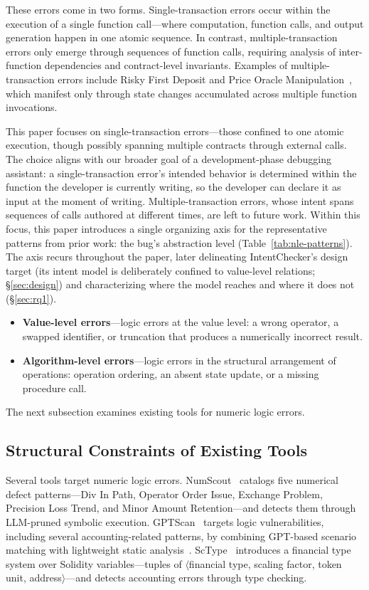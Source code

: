 \documentclass[pdflatex,sn-basic]{sn-jnl}%
\theoremstyle{thmstyleone}%
\theoremstyle{thmstyletwo}%
\theoremstyle{thmstylethree}%
\begin{document}
These errors come in two forms.
Single-transaction errors occur within the execution of a single function call---where computation, function calls, and output generation happen in one atomic sequence.
In contrast, multiple-transaction errors only emerge through sequences of function calls, requiring analysis of inter-function dependencies and contract-level invariants.
Examples of multiple-transaction errors include Risky First Deposit and Price Oracle Manipulation~\citep{gptscan, exploitablebugs}, which manifest only through state changes accumulated across multiple function invocations.

This paper focuses on single-transaction errors---those confined to one atomic execution, though possibly spanning multiple contracts through external calls. The choice aligns with our broader goal of a development-phase debugging assistant: a single-transaction error's intended behavior is determined within the function the developer is currently writing, so the developer can declare it as input at the moment of writing. Multiple-transaction errors, whose intent spans sequences of calls authored at different times, are left to future work. Within this focus, this paper introduces a single organizing axis for the representative patterns from prior work: the bug's abstraction level (Table~\ref{tab:nle-patterns}). The axis recurs throughout the paper, later delineating IntentChecker's design target (its intent model is deliberately confined to value-level relations; \S\ref{sec:design}) and characterizing where the model reaches and where it does not (\S\ref{sec:rq1}).
\begin{itemize}
    \item \textbf{Value-level errors}---logic errors at the value level: a wrong operator, a swapped identifier, or truncation that produces a numerically incorrect result.
    \item \textbf{Algorithm-level errors}---logic errors in the structural arrangement of operations: operation ordering, an absent state update, or a missing procedure call.
\end{itemize}

The next subsection examines existing tools for numeric logic errors.

\subsection{Structural Constraints of Existing Tools}

Several tools target numeric logic errors.
NumScout~\citep{numscout} catalogs five numerical defect patterns---Div In Path,
Operator Order Issue, Exchange Problem, Precision Loss Trend, and Minor Amount
Retention---and detects them through LLM-pruned symbolic execution.
GPTScan~\citep{gptscan} targets logic vulnerabilities, including several
accounting-related patterns, by combining GPT-based scenario matching with
lightweight static analysis~\citep{slither}.
ScType~\citep{sctype} introduces a financial type system over Solidity
variables---tuples of $\langle$financial type, scaling factor, token unit,
address$\rangle$---and detects accounting errors through type checking.
\end{document}

